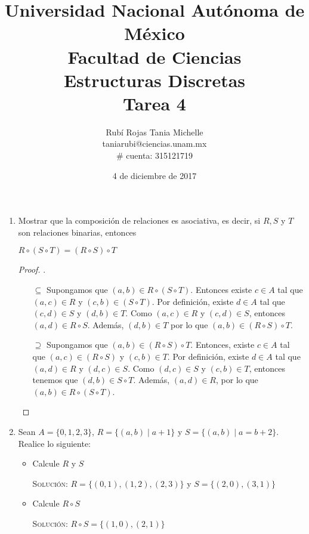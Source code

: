 \documentclass[letterpaper,11pt]{article}
\title{Universidad Nacional Autónoma de México \\
       Facultad de Ciencias \\
       Estructuras Discretas \\ 
       Tarea 4}
\author{Rubí Rojas Tania Michelle \\
        taniarubi@ciencias.unam.mx \\
        \# cuenta: 315121719}
\date{4 de diciembre de 2017}
\begin{document}
\maketitle

\begin{enumerate}
    \item Mostrar que la composición de relaciones es asociativa, es decir, si
    $R, S$ y $T$ son relaciones binarias, entonces

    \begin{center}
        $R ∘ (S ∘ T) = (R ∘ S) ∘ T$
    \end{center}

    \begin{proof} .
        \begin{itemize}
            \item[$⊆$] Supongamos que $(a, b) \in R ∘ (S ∘ T)$. Entonces existe 
            $c \in A$ tal que $(a, c) \in R$ y $(c, b) \in (S ∘ T)$. Por 
            definición, existe $d \in A$ tal que $(c,d) \in S$ y 
            $(d, b) \in T$. Como $(a, c) \in R$ y $(c,d) \in S$, entonces 
            $(a, d) \in R ∘ S$. Además, $(d, b) \in T$ por lo que 
            $(a, b) \in (R ∘ S) ∘ T$.

            \item[$⊇$] Supongamos que $(a,b) \in (R ∘ S) ∘ T$. Entonces, existe
            $c \in A$ tal que $(a,c) \in (R ∘ S)$ y $(c,b) \in T$. Por definición,
            existe $d \in A$ tal que $(a, d) \in R$ y $(d, c) \in S$. Como $
            (d,c) \in S$ y $(c,b) \in T$, entonces tenemos que $(d, b) \in S ∘ T$.
            Además, $(a, d) \in R$, por lo que $(a, b) \in R ∘ (S ∘ T)$.  
        \end{itemize}
    \end{proof}

    \item Sean $A = \{0, 1, 2, 3\}$, $R = \{(a,b) \; | \; a+1\}$ y 
    $S = \{(a,b) \; | \; a = b+2\}$. Realice lo siguiente:

    \begin{itemize}
        \item Calcule $R$ y $S$

        \textsc{Solución:} $R = \{(0,1), (1,2), (2,3)\}$ y $S = \{(2,0), (3,1)\}$

        \item Calcule $R ∘ S$

        \textsc{Solución:} $R ∘ S = \{(1,0), (2,1)\}$


\end{itemize}
\end{enumerate}
\end{document}
